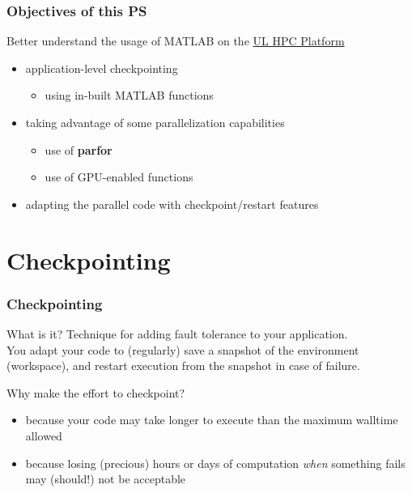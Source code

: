 \documentclass{beamer}
\newcommand{\ULHPC}{\href{http://hpc.uni.lu}{UL HPC Platform}\xspace}
\begin{document}
\begin{frame}
  \frametitle{Objectives of this PS}

  Better understand the usage of MATLAB on the \ULHPC
 
  \begin{exampleblock}{}
    \begin{itemize}
      \item application-level checkpointing
      \begin{itemize}
        \item using in-built MATLAB functions
      \end{itemize}
     \end{itemize}
   \end{exampleblock}
   \pause
   \begin{exampleblock}{}
    \begin{itemize}
     \item taking advantage of some parallelization capabilities
      \begin{itemize}
       \item use of \textbf{parfor}
       \item use of GPU-enabled functions
      \end{itemize}
     \end{itemize}
    \end{exampleblock}   
    \pause
    \begin{exampleblock}{}
    \begin{itemize}
     \item adapting the parallel code with checkpoint/restart features
    \end{itemize}
    \end{exampleblock}   

\end{frame}

\section{Checkpointing}

\begin{frame}
  \frametitle{Checkpointing}
 
  \begin{block}{What is it?}
  Technique for adding fault tolerance to your application. \\ 
  You adapt your code to (regularly) save a snapshot of the environment (workspace), and restart execution from the snapshot in case of failure.
  \end{block}
   \pause
   \begin{block}{Why make the effort to checkpoint?}
    \begin{itemize}
     \item because your code may take longer to execute than the maximum walltime allowed
     \item because losing (precious) hours or days of computation \emph{when} something fails may (should!) not be acceptable
     \end{itemize}
    \end{block}   
\end{frame}
\end{document}
